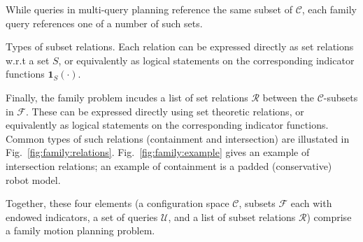 \begin{marginfigure}
   \centering
   \vspace{-0.05in}
   \vspace{0.1in}
   \caption{While queries in multi-query planning reference
     the same subset of $\mathcal{C}$,
     each family query references one of a number of such sets.}
   \label{fig:family:query-to-subset}
\end{marginfigure}

\begin{marginfigure}
   \centering
   \vspace{-0.05in}
   \vspace{0.1in}
   \caption{Types of subset relations.
     Each relation can be expressed directly as set relations
     w.r.t a set $S$,
     or equivalently as logical statements
     on the corresponding indicator functions
     $\mathbf{1}_S(\cdot)$.}
   \label{fig:family:relations}
\end{marginfigure}

Finally, the family problem incudes a list of set relations
$\mathcal{R}$
between the $\mathcal{C}$-subsets in $\mathcal{F}$.
These can be expressed directly using set theoretic relations,
or equivalently as logical statements
on the corresponding indicator functions.
Common types of such relations
(containment and intersection)
are illustated in Fig.~\ref{fig:family:relations}.
Fig.~\ref{fig:family:example} gives an example of intersection relations;
an example of containment is a padded (conservative) robot model.

Together, these four elements
(a configuration space $\mathcal{C}$,
subsets $\mathcal{F}$ each with endowed indicators,
a set of queries $\mathcal{U}$,
and a list of subset relations $\mathcal{R}$)
comprise a family motion planning problem.

